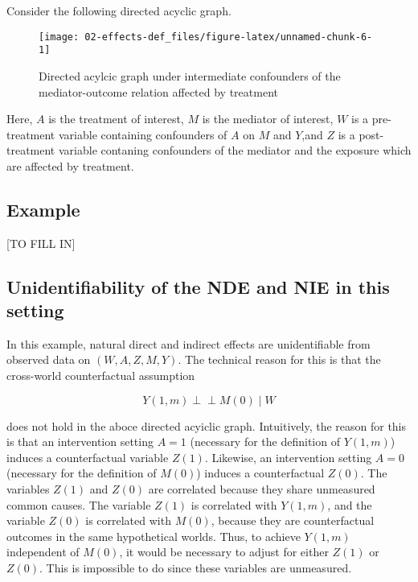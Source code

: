 \documentclass[
  12pt, krantz2,
]{book}
\theoremstyle{definition}
\theoremstyle{definition}
\theoremstyle{definition}
\newcommand{\indep}{\mbox{$\perp\!\!\!\perp$}}
\newcommand{\1}{\mathbbm{1}}
\begin{document}
Consider the following directed acyclic graph.

\begin{figure}

{\centering \texttt{[image: 02-effects-def\_files/figure-latex/unnamed-chunk-6-1]} 

}

\caption{Directed acylcic graph under intermediate confounders of the mediator-outcome relation affected by treatment}\label{fig:unnamed-chunk-6}
\end{figure}

Here, \(A\) is the treatment of interest, \(M\) is the mediator of
interest, \(W\) is a pre-treatment variable containing confounders of
\(A\) on \(M\) and \(Y\),and \(Z\) is a post-treatment variable contaning
confounders of the mediator and the exposure which are affected by
treatment.

\hypertarget{example}{%
\subsection{Example}\label{example}}

{[}TO FILL IN{]}

\hypertarget{unidentifiability-of-the-nde-and-nie-in-this-setting}{%
\subsection{Unidentifiability of the NDE and NIE in this setting}\label{unidentifiability-of-the-nde-and-nie-in-this-setting}}

In this example, natural direct and indirect effects are
unidentifiable from observed data on \((W,A,Z,M,Y)\). The technical
reason for this is that the cross-world counterfactual assumption

\[Y(1,m)\indep M(0)\mid W\]

does not hold in the aboce directed acyiclic graph. Intuitively, the
reason for this is that an intervention setting \(A=1\) (necessary for
the definition of \(Y(1,m)\)) induces a counterfactual variable
\(Z(1)\). Likewise, an intervention setting \(A=0\) (necessary for the
definition of \(M(0)\)) induces a counterfactual \(Z(0)\). The variables
\(Z(1)\) and \(Z(0)\) are correlated because they share unmeasured common
causes. The variable \(Z(1)\) is correlated with \(Y(1,m)\), and the
variable \(Z(0)\) is correlated with \(M(0)\), because they are
counterfactual outcomes in the same hypothetical worlds. Thus, to
achieve \(Y(1,m)\) independent of \(M(0)\), it would be necessary to
adjust for either \(Z(1)\) or \(Z(0)\). This is impossible to do since
these variables are unmeasured.
\end{document}
